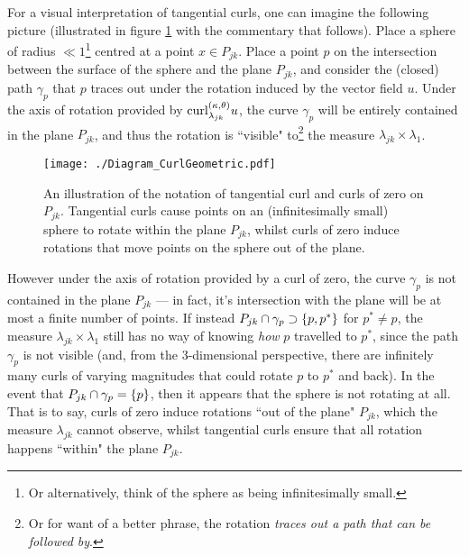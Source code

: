 For a visual interpretation of tangential curls, one can imagine the following picture (illustrated in figure \ref{fig:Diagram_CurlGeometric} with the commentary that follows).
Place a sphere of radius $\ll 1$\footnote{Or alternatively, think of the sphere as being infinitesimally small.} centred at a point $x\in P_{jk}$.
Place a point $p$ on the intersection between the surface of the sphere and the plane $P_{jk}$, and consider the (closed) path $\gamma_p$ that $p$ traces out under the rotation induced by the vector field $u$.
Under the axis of rotation provided by $\mathrm{curl}_{\lambda_{jk}}^{\left( \kappa, \theta \right)}u$, the curve $\gamma_p$ will be entirely contained in the plane $P_{jk}$, and thus the rotation is ``visible" to\footnote{Or for want of a better phrase, the rotation \emph{traces out a path that can be followed by}.} the measure $\lambda_{jk}\times\lambda_1$.
\begin{figure}[b!]
	\centering
	\texttt{[image: ./Diagram\_CurlGeometric.pdf]}
	\caption{\label{fig:Diagram_CurlGeometric} An illustration of the notation of tangential curl and curls of zero on $P_{jk}$. Tangential curls cause points on an (infinitesimally small) sphere to rotate within the plane $P_{jk}$, whilst curls of zero induce rotations that move points on the sphere out of the plane.}
\end{figure}
However under the axis of rotation provided by a curl of zero, the curve $\gamma_p$ is not contained in the plane $P_{jk}$ --- in fact, it's intersection with the plane will be at most a finite number of points.
If instead $P_{jk}\cap\gamma_p\supset\left\{ p,p^* \right\}$ for $p^*\neq p$, the measure $\lambda_{jk}\times\lambda_1$ still has no way of knowing \emph{how} $p$ travelled to $p^*$, since the path $\gamma_p$ is not visible (and, from the 3-dimensional perspective, there are infinitely many curls of varying magnitudes that could rotate $p$ to $p^*$ and back).
In the event that $P_{jk}\cap\gamma_p=\left\{ p \right\}$, then it appears that the sphere is not rotating at all.
That is to say, curls of zero induce rotations ``out of the plane" $P_{jk}$, which the measure $\lambda_{jk}$ cannot observe, whilst tangential curls ensure that all rotation happens ``within" the plane $P_{jk}$.


